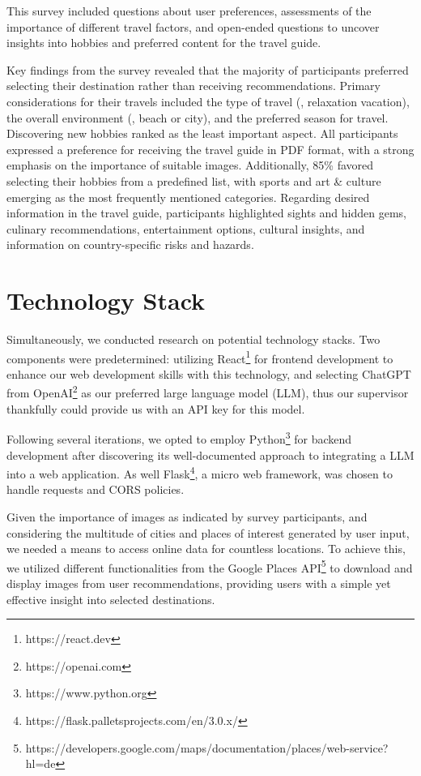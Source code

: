 \documentclass[english,notitlepage,smartquotes]{hgbreport}
\begin{document}
This survey included questions about user preferences, assessments of the importance of different travel factors, and open-ended questions to uncover insights into hobbies and preferred content for the travel guide.

Key findings from the survey revealed that the majority of participants preferred selecting their destination rather than receiving recommendations. Primary considerations for their travels included the type of travel (\eg, relaxation vacation), the overall environment (\eg, beach or city), and the preferred season for travel. Discovering new hobbies ranked as the least important aspect. All participants expressed a preference for receiving the travel guide in PDF format, with a strong emphasis on the importance of suitable images. Additionally, 85\% favored selecting their hobbies from a predefined list, with sports and art \& culture emerging as the most frequently mentioned categories. Regarding desired information in the travel guide, participants highlighted sights and hidden gems, culinary recommendations, entertainment options, cultural insights, and information on country-specific risks and hazards.

\section{Technology Stack}
Simultaneously, we conducted research on potential technology stacks. Two components were predetermined: utilizing React\footnote{https://react.dev} for frontend development to enhance our web development skills with this technology, and selecting ChatGPT from OpenAI\footnote{https://openai.com} as our preferred large language model (LLM), thus our supervisor thankfully could provide us with an API key for this model.

Following several iterations, we opted to employ Python\footnote{https://www.python.org} for backend development after discovering its well-documented approach to integrating a LLM into a web application. As well Flask\footnote{https://flask.palletsprojects.com/en/3.0.x/}, a micro web framework, was chosen to handle requests and CORS policies.

Given the importance of images as indicated by survey participants, and considering the multitude of cities and places of interest generated by user input, we needed a means to access online data for countless locations. To achieve this, we utilized different functionalities from the Google Places API\footnote{https://developers.google.com/maps/documentation/places/web-service?hl=de} to download and display images from user recommendations, providing users with a simple yet effective insight into selected destinations.
\end{document}
